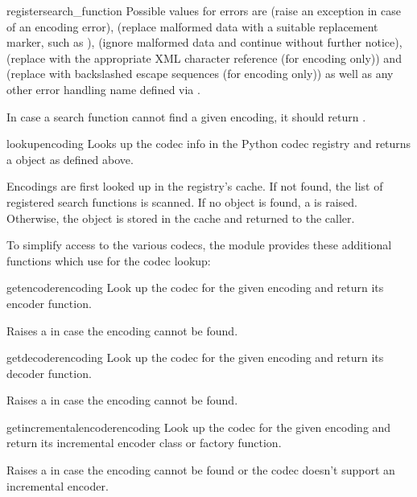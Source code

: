 \begin{funcdesc}{register}{search_function}
  Possible values for errors are  (raise an exception
  in case of an encoding error),  (replace malformed
  data with a suitable replacement marker, such as ),
   (ignore malformed data and continue without further
  notice),  (replace with the appropriate XML
  character reference (for encoding only)) and 
  (replace with backslashed escape sequences (for encoding only)) as
  well as any other error handling name defined via
  .

In case a search function cannot find a given encoding, it should
return .
\end{funcdesc}

\begin{funcdesc}{lookup}{encoding}
Looks up the codec info in the Python codec registry and returns a
 object as defined above.

Encodings are first looked up in the registry's cache. If not found,
the list of registered search functions is scanned. If no 
object is found, a  is raised. Otherwise, the
 object is stored in the cache and returned to the caller.
\end{funcdesc}

To simplify access to the various codecs, the module provides these
additional functions which use  for the codec
lookup:

\begin{funcdesc}{getencoder}{encoding}
Look up the codec for the given encoding and return its encoder
function.

Raises a  in case the encoding cannot be found.
\end{funcdesc}

\begin{funcdesc}{getdecoder}{encoding}
Look up the codec for the given encoding and return its decoder
function.

Raises a  in case the encoding cannot be found.
\end{funcdesc}

\begin{funcdesc}{getincrementalencoder}{encoding}
Look up the codec for the given encoding and return its incremental encoder
class or factory function.

Raises a  in case the encoding cannot be found or the
codec doesn't support an incremental encoder.
\end{funcdesc}

